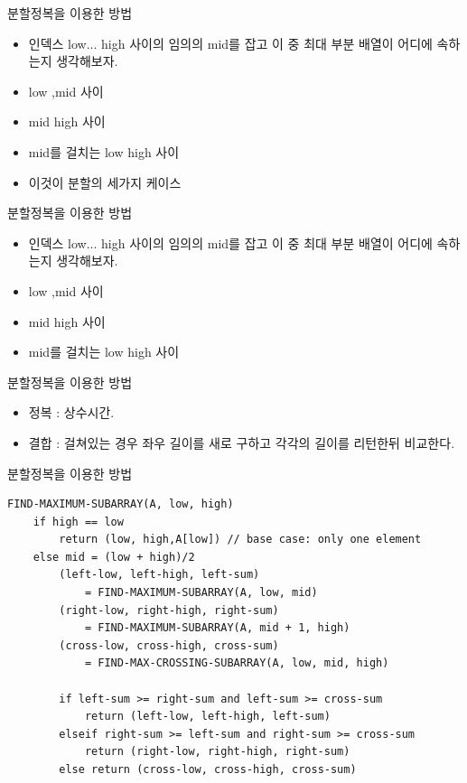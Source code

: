 \documentclass[10pt]{beamer}
\begin{document}
\begin{frame}{분할정복을 이용한 방법}
    \begin{itemize}
        \item 인덱스 low... high 사이의 임의의 mid를 잡고 이 중 최대 부분 배열이 어디에 속하는지 생각해보자.
        \item low ,mid 사이
        \item mid high 사이
        \item mid를 걸치는 low high 사이
        \item 이것이 분할의 세가지 케이스
    \end{itemize}
\end{frame}


\begin{frame}{분할정복을 이용한 방법}
    \begin{itemize}
        \item 인덱스 low... high 사이의 임의의 mid를 잡고 이 중 최대 부분 배열이 어디에 속하는지 생각해보자.
        \item low ,mid 사이
        \item mid high 사이
        \item mid를 걸치는 low high 사이
    \end{itemize}
\end{frame}


\begin{frame}{분할정복을 이용한 방법}
    \begin{itemize}
        \item 정복 : 상수시간.
        \item 결합 : 걸쳐있는 경우 좌우 길이를 새로 구하고 각각의 길이를 리턴한뒤 비교한다.
    \end{itemize}
\end{frame}


\begin{frame}[fragile]{분할정복을 이용한 방법}
    \begin{lstlisting}[style = CppStyle]
    FIND-MAXIMUM-SUBARRAY(A, low, high)
    if high == low
        return (low, high,A[low]) // base case: only one element
    else mid = (low + high)/2 
        (left-low, left-high, left-sum) 
            = FIND-MAXIMUM-SUBARRAY(A, low, mid)
        (right-low, right-high, right-sum) 
            = FIND-MAXIMUM-SUBARRAY(A, mid + 1, high)
        (cross-low, cross-high, cross-sum) 
            = FIND-MAX-CROSSING-SUBARRAY(A, low, mid, high)

        if left-sum >= right-sum and left-sum >= cross-sum
            return (left-low, left-high, left-sum)
        elseif right-sum >= left-sum and right-sum >= cross-sum
            return (right-low, right-high, right-sum)
        else return (cross-low, cross-high, cross-sum)
    \end{lstlisting}
\end{frame}    
\end{document}
